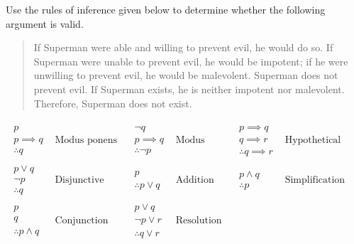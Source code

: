 \documentclass[addpoints]{exam}
\theoremstyle{definition}
\theoremstyle{claim}
\begin{document}
\begin{questions}
  \question  [10] Use the rules of inference given below to determine whether the following argument is valid.
  \begin{quotation}
If Superman were able and willing to prevent evil, he would do so. If Superman were unable to prevent evil, he would be impotent; if he were unwilling to prevent evil, he would be malevolent. Superman does not prevent evil. If Superman exists, he is neither impotent nor malevolent. Therefore, Superman does not exist.    
  \end{quotation}
  \[
    \begin{array}{cc||cc||cc}
      \begin{array}{l}
        p\\p\implies q\\\hline\therefore q
      \end{array}
      &
        \text{Modus ponens}& 
      \begin{array}{l}
        \neg q\\p\implies q\\\hline\therefore \neg p
      \end{array}
      &
        \text{Modus tollens}& 
      \begin{array}{l}
        p\implies q\\q\implies r\\\hline\therefore q\implies r
      \end{array}
      &
        \text{Hypothetical syllogism}\\
      \hline\hline
      \begin{array}{l}
        p\lor q\\\neg p\\\hline\therefore q
      \end{array}
      &
        \text{Disjunctive syllogism}&
      \begin{array}{l}
        p\\\hline\therefore p\lor q
      \end{array}
      &
        \text{Addition}& 
      \begin{array}{l}
        p\land q\\\hline\therefore p
      \end{array}
      &
        \text{Simplification}\\
      \hline\hline
      \begin{array}{l}
        p\\ q\\\hline\therefore p\land q
      \end{array}
      &
        \text{Conjunction}& 
      \begin{array}{l}
        p\lor q\\ \neg p\lor r\\\hline\therefore q\lor r
      \end{array}
      &
        \text{Resolution} 
    \end{array}
  \]
  

\end{questions}
\end{document}
